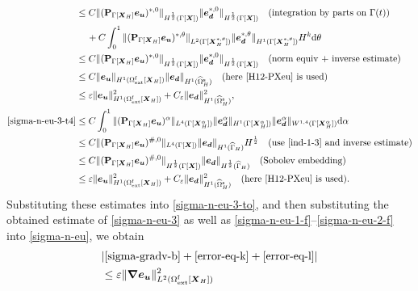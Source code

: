 \documentclass[11pt,reqno]{amsart}
\theoremstyle{definition}
\theoremstyle{plain}
\numberwithin{theorem}{section}
\numberwithin{proposition}{section}
\numberwithin{lemma}{section}
\numberwithin{equation}{section}
\newcommand{\bs}[1]{\boldsymbol{#1}}
\newcommand{\uu}[1]  {{\bs{#1}} }
\newcommand{\dep}{{{\bs{d}}}}
\newcommand{\grad}   { \uu{\nabla}    }
\def\d{\mathrm{d}}
\renewcommand{\(}{\bigl(}
\renewcommand{\)}{\bigr)}
\begin{document}
\begin{itemize}[leftmargin=20pt]
\begin{align}
&\le C\|({\bf P}_{\Gamma[\bs X_H]}{\bs e}_{\bs u})^{*,0}\|_{H^{\frac12}(\Gamma[\bs X])} \| {\bs e}_\dep^{*,0} \|_{H^{\frac12}(\Gamma[\bs X])} 
\quad\mbox{(integration by parts on $\Gamma(t)$)} \notag\\
&\quad\, 
+ C\int_0^1 \|({\bf P}_{\Gamma[\bs X_H]}{\bs e}_{\bs u})^{*,\theta}\|_{L^2(\Gamma[\bs X_H^{*,\theta}])} 
\| {\bs e}_\dep^{*,\theta} \|_{H^1(\Gamma[\bs X_H^{*,\theta}])} H^k \d\theta \notag\\
&\le C\|({\bf P}_{\Gamma[\bs X_H]}{\bs e}_{\bs u})^{*,0}\|_{H^{\frac12}(\Gamma[\bs X])} \| {\bs e}_\dep^{*,0} \|_{H^{\frac12}(\Gamma[\bs X])} 
\quad\mbox{(norm equiv + inverse estimate)} \notag\\
&\le C\| {\bs e}_{\bs u}\|_{H^1(\Omega^{\rm f}_{\rm ext}[\bs  X_H])} \| {\bs e}_\dep\|_{H^1(\widehat{\Omega}^{\rm s}_H)} 
\quad\mbox{(here \eqref{H12-PXeu} is used)}\notag\\
&\le \varepsilon\| {\bs e}_{\bs u}\|_{H^1(\Omega^{\rm f}_{\rm ext}[\bs  X_H])}^2
+ C_{\varepsilon} \| {\bs e}_\dep\|_{H^1(\widehat{\Omega}^{\rm s}_H)}^2 , \\
%
\eqref{sigma-n-eu-3-t4} 
&\le 
C\int_0^1 \|({\bf P}_{\Gamma[\bs X_H]}{\bs e}_{\bs u})^\alpha\|_{L^4(\Gamma[\bs X_H^{\alpha}])} \| {\bs e}_\dep^\alpha \|_{H^1(\Gamma[\bs X_H^{\alpha}])} \| {\bs e}_\dep^\alpha \|_{W^{1,4}(\Gamma[\bs X_H^{\alpha}])}  \d\alpha \notag\\
&\le C\|({\bf P}_{\Gamma[\bs X_H]}{\bs e}_{\bs u})^{\#,0}\|_{L^4(\Gamma[\bs X])}\| {\bs e}_\dep \|_{H^1(\widehat\Gamma_H)} H^{\frac12}
\quad\mbox{(use \eqref{ind-1-3} and inverse estimate)}\notag\\
&\le C\|({\bf P}_{\Gamma[\bs X_H]}{\bs e}_{\bs u})^{\#,0}\|_{H^{\frac12}(\Gamma[\bs X])}\| {\bs e}_\dep \|_{H^{\frac12}(\widehat\Gamma_H)}  \quad\mbox{(Sobolev embedding)}\notag\\
&\le \varepsilon\| {\bs e}_{\bs u}\|_{H^1(\Omega^{\rm f}_{\rm ext}[\bs  X_H])}^2
+ C_{\varepsilon} \| {\bs e}_\dep\|_{H^1(\widehat{\Omega}^{\rm s}_H)}^2 \quad\mbox{(here \eqref{H12-PXeu} is used)} .
%
\end{align}
Substituting these estimates into \eqref{sigma-n-eu-3-to}, and then substituting the obtained estimate of \eqref{sigma-n-eu-3} as well as \eqref{sigma-n-eu-1-f}--\eqref{sigma-n-eu-2-f} into \eqref{sigma-n-eu}, we obtain
\begin{align*} 
&|\eqref{sigma-gradv-b} + \eqref{error-eq-k} + \eqref{error-eq-l} | \notag\\ 
&\le 
\varepsilon\|\grad {\bs e}_{\bs u}\|_{L^2(\Omega^{\rm f}_{\rm ext}[{\bs X}_H])}^2 

\end{align*}
\end{itemize}
\end{document}
